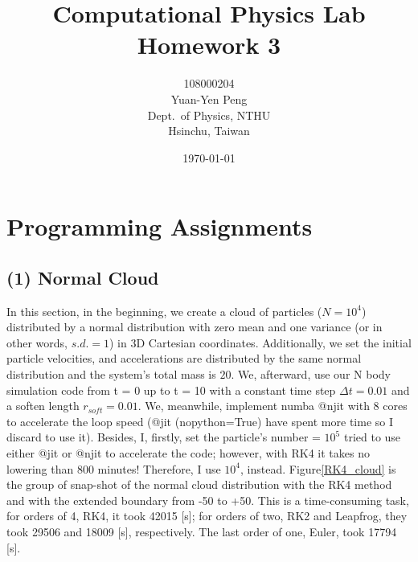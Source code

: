 \documentclass[12pt]{article}
\begin{document}
\title{\textbf{{\normalsize Computational Physics Lab}\\
                Homework 3}}
\author{108000204\\
        Yuan-Yen Peng\\
        Dept.\ of Physics, NTHU\\
        Hsinchu, Taiwan}
\date{\today}
\maketitle


\section{Programming Assignments}
  \subsection{(1) Normal Cloud}
  In this section, in the beginning, we create a cloud of particles ($N = 10^4$) distributed by a normal distribution with zero mean and one variance (or in other words, $s.d. = 1$) in 3D Cartesian coordinates. Additionally, we set the initial particle velocities, and accelerations are distributed by the same normal distribution and the system's total mass is $20$. We, afterward, use our N body simulation code from t = 0 up to t = 10 with a constant time step $\Delta t = 0.01$ and a soften length $r_{soft} = 0.01$. We, meanwhile, implement {\ttfamily numba @njit} with 8 cores to accelerate the loop speed ({\ttfamily @jit (nopython=True)} have spent more time so I discard to use it). Besides, I, firstly, set the particle's number = $10^5$ tried to use either {\ttfamily @jit} or {\ttfamily @njit} to accelerate the code; however, with {\ttfamily RK4} it takes no lowering than 800 minutes! Therefore, I use $10^4$, instead. Figure\ref{RK4_cloud} is the group of snap-shot of the normal cloud distribution with the RK4 method and with the extended boundary from -50 to +50. This is a time-consuming task, for orders of 4, RK4, it took 42015 [s]; for orders of two, RK2 and Leapfrog, they took 29506 and 18009 [s], respectively. The last order of one, Euler, took 17794 [s].
  
  \vspace{6pt}
\end{document}
